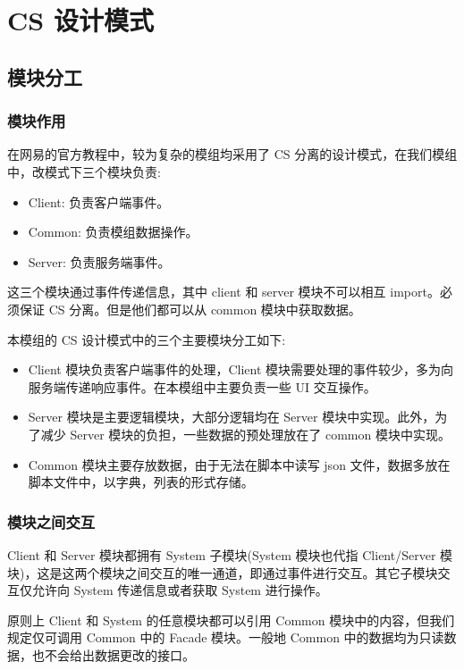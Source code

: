 \section{CS 设计模式}

\subsection{模块分工}

\subsubsection{模块作用}

在网易的官方教程中，较为复杂的模组均采用了 CS 分离的设计模式，在我们模组中，改模式下三个模块负责:
\begin{itemize}
    \item Client: 负责客户端事件。
    \item Common: 负责模组数据操作。
    \item Server: 负责服务端事件。
\end{itemize}

这三个模块通过事件传递信息，其中 client 和 server 模块不可以相互 import。必须保证 CS 分离。但是他们都可以从 common 模块中获取数据。

本模组的 CS 设计模式中的三个主要模块分工如下:
\begin{itemize}
    \item Client 模块负责客户端事件的处理，Client 模块需要处理的事件较少，多为向服务端传递响应事件。在本模组中主要负责一些 UI 交互操作。
    \item Server 模块是主要逻辑模块，大部分逻辑均在 Server 模块中实现。此外，为了减少 Server 模块的负担，一些数据的预处理放在了 common 模块中实现。
    \item Common 模块主要存放数据，由于无法在脚本中读写 json 文件，数据多放在脚本文件中，以字典，列表的形式存储。
\end{itemize}

\subsubsection{模块之间交互}

Client 和 Server 模块都拥有 System 子模块(System 模块也代指 Client/Server 模块)，这是这两个模块之间交互的唯一通道，即通过事件进行交互。其它子模块交互仅允许向 System 传递信息或者获取 System 进行操作。

原则上 Client 和 System 的任意模块都可以引用 Common 模块中的内容，但我们规定仅可调用 Common 中的 Facade 模块。一般地 Common 中的数据均为只读数据，也不会给出数据更改的接口。

